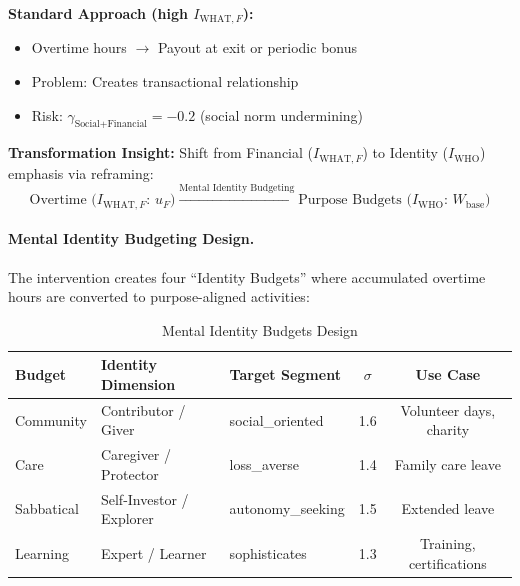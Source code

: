 \begin{tcolorbox}[colback=red!5!white, colframe=red!75!black,
    title=\textbf{Design Challenge: Financial Emphasis Crowding-Out}]

\textbf{Standard Approach (high $I_{\text{WHAT},F}$):}
\begin{itemize}[nosep]
    \item Overtime hours $\rightarrow$ Payout at exit or periodic bonus
    \item Problem: Creates transactional relationship
    \item Risk: $\gamma_{\text{Social+Financial}} = -0.2$ (social norm undermining)
\end{itemize}

\textbf{Transformation Insight:} Shift from Financial ($I_{\text{WHAT},F}$) to Identity ($I_{\text{WHO}}$) emphasis via reframing:
\begin{equation}
\text{Overtime (} I_{\text{WHAT},F}\text{: } u_F\text{)} \xrightarrow{\text{Mental Identity Budgeting}} \text{Purpose Budgets (}I_{\text{WHO}}\text{: } W_{\text{base}}\text{)}
\label{eq:hhh-t7-t5-transformation}
\end{equation}

\end{tcolorbox}

\paragraph{Mental Identity Budgeting Design.}

The intervention creates four ``Identity Budgets'' where accumulated overtime hours are converted to purpose-aligned activities:

\begin{table}[htbp]
\centering
\caption{Mental Identity Budgets Design}
\label{tab:hhh-identity-budgets}
\renewcommand{\arraystretch}{1.3}
\small
\begin{tabular}{@{}lllcc@{}}
\toprule
\textbf{Budget} & \textbf{Identity Dimension} & \textbf{Target Segment} & \textbf{$\sigma$} & \textbf{Use Case} \\
\midrule
Community & Contributor / Giver & social\_oriented & 1.6 & Volunteer days, charity \\
Care & Caregiver / Protector & loss\_averse & 1.4 & Family care leave \\
Sabbatical & Self-Investor / Explorer & autonomy\_seeking & 1.5 & Extended leave \\
Learning & Expert / Learner & sophisticates & 1.3 & Training, certifications \\
\bottomrule
\end{tabular}
\end{table}

